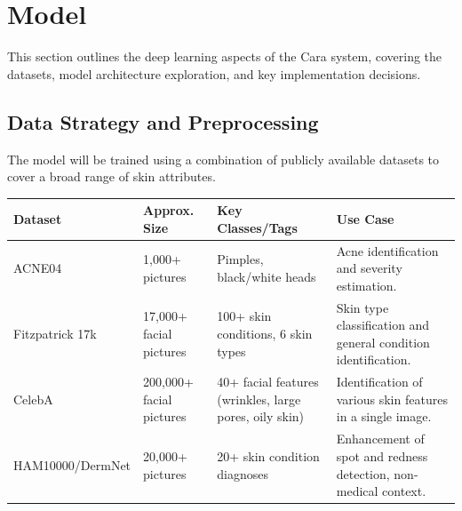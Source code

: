 \documentclass[12pt,a4paper]{article}
\begin{document}
\section{Model}
This section outlines the deep learning aspects of the Cara system, covering the datasets, model architecture exploration, and key implementation decisions.

\subsection{Data Strategy and Preprocessing}
The model will be trained using a combination of publicly available datasets to cover a broad range of skin attributes.

\begin{table}[h]
\centering
\begin{tabularx}{\textwidth}{|l|l|X|X|}
\hline
\textbf{Dataset} & \textbf{Approx. Size} & \textbf{Key Classes/Tags} & \textbf{Use Case} \\
\hline
ACNE04 & 1,000+ pictures & Pimples, black/white heads & Acne identification and severity estimation. \\
\hline
Fitzpatrick 17k & 17,000+ facial pictures & 100+ skin conditions, 6 skin types & Skin type classification and general condition identification. \\
\hline
CelebA & 200,000+ facial pictures & 40+ facial features (wrinkles, large pores, oily skin) & Identification of various skin features in a single image. \\
\hline
HAM10000/DermNet & 20,000+ pictures & 20+ skin condition diagnoses & Enhancement of spot and redness detection, non-medical context. \\
\hline
\end{tabularx}
\end{table}
\end{document}
